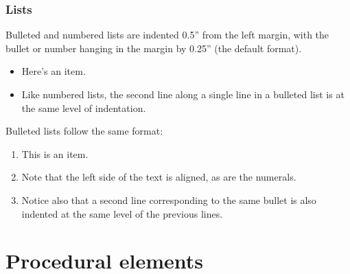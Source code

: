 {{{{\subsubsection{Lists}
Bulleted and numbered lists are indented 0.5'' from the left margin, with the bullet or number hanging in the margin by 0.25'' (the default format).

\begin{itemize}
\item
  Here's an item.

\item
  Like numbered lists, the second line along a single line in a bulleted list is
  at the same level of indentation.
\end{itemize}

Bulleted lists follow the same format:
%
\begin{enumerate}
\item
  This is an item.
\item
  Note that the left side of the text is aligned, as are the numerals.
\item
  Notice also that a second line corresponding to the same bullet is also
  indented at the same level of the previous lines.
\end{enumerate}


\section{Procedural elements}

\notext

}}}}
